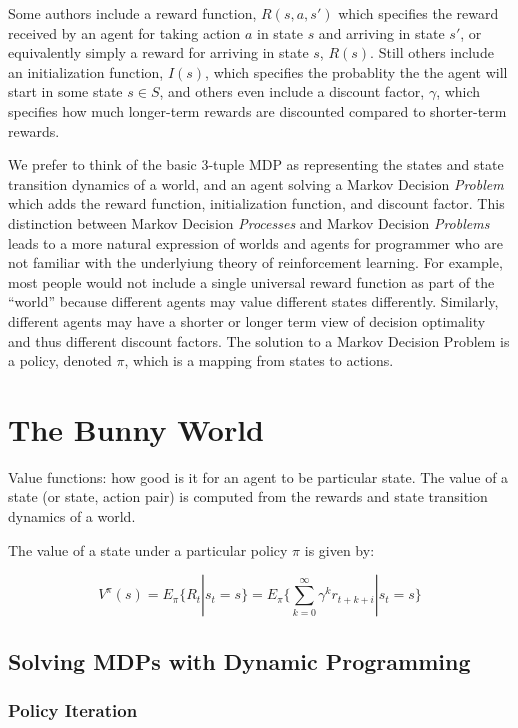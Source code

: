 Some authors include a reward function, $R(s, a, s')$ which specifies the reward received by an agent for taking action $a$ in state $s$ and arriving in state $s'$, or equivalently simply a reward for arriving in state $s$, $R(s)$. Still others include an initialization function, $I(s)$, which specifies the probablity the the agent will start in some state $s \in S$, and others even include a discount factor, $\gamma$, which specifies how much longer-term rewards are discounted compared to shorter-term rewards.

We prefer to think of the basic 3-tuple MDP as representing the states and state transition dynamics of a world, and an agent solving a Markov Decision {\it Problem} which adds the reward function, initialization function, and discount factor. This distinction between Markov Decision {\it Processes} and Markov Decision {\it Problems} leads to a more natural expression of worlds and agents for programmer who are not familiar with the underlyiung theory of reinforcement learning. For example, most people would not include a single universal reward function as part of the ``world'' because different agents may value different states differently. Similarly, different agents may have a shorter or longer term view of decision optimality and thus different discount factors. The solution to a Markov Decision Problem is a policy, denoted $\pi$, which is a mapping from states to actions.


\section{The Bunny World}

Value functions: how good is it for an agent to be particular state. The value of a state (or state, action pair) is computed from the rewards and state transition dynamics of a world.

The value of a state under a particular policy $\pi$ is given by:

\[
V^\pi(s) = E_\pi\{R_t | s_t = s\} = E_\pi \{ \sum_{k=0}^{\infty} \gamma^k r_{t+k+i} | s_t = s \}
\]




\subsection{Solving MDPs with Dynamic Programming}

\subsubsection{Policy Iteration}

